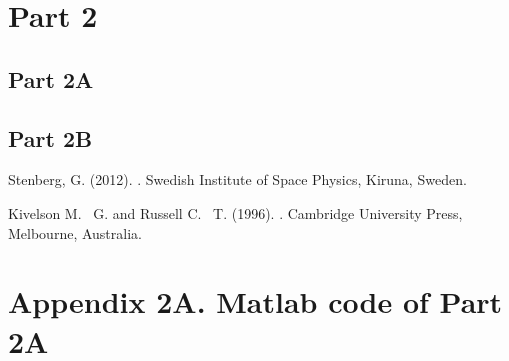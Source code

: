 \documentclass{article}
\begin{document}

\section{Part 2}


\subsection{Part 2A}


\subsection{Part 2B}


\begin{thebibliography}{9}

Stenberg, G.  (2012).
.
\newblock Swedish Institute of Space Physics, Kiruna, Sweden.

Kivelson M. ~G. and Russell C. ~T.  (1996).
.
\newblock Cambridge University Press, Melbourne, Australia.

\end{thebibliography}


\section{Appendix 2A. Matlab code of Part 2A}
\end{document}
